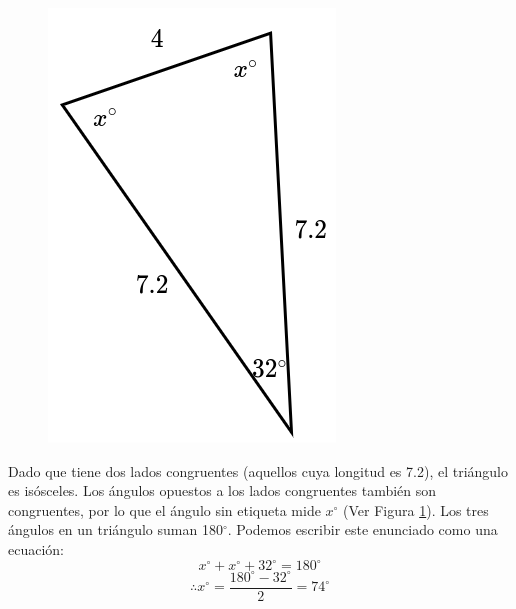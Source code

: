 \begin{minipage}[t][][t]{0.65\textwidth}
    \begin{solutionbox}{7cm}
        \begin{minipage}{0.3\textwidth}
            \begin{figure}[H]
                \centering
                \includegraphics[width=0.9\linewidth]{../images/findangle13a.png}
                \caption{}
                \label{fig:findangle13a}
            \end{figure}
        \end{minipage}\hfill
        \begin{minipage}{0.65\textwidth}
            Dado que tiene dos lados congruentes (aquellos cuya longitud es 7.2), el triángulo es isósceles. Los ángulos opuestos a los lados congruentes también son congruentes, por lo que el ángulo sin etiqueta mide $x^\circ$ (Ver Figura \ref{fig:findangle13a}).
            Los tres ángulos en un triángulo suman 180$^\circ$. Podemos escribir este enunciado como una ecuación:
            \[x^\circ + x^\circ + 32^\circ = 180^\circ \]
            \[\therefore x^\circ = \dfrac{180^\circ - 32^\circ}{2}  = 74^\circ\]
        \end{minipage}
    \end{solutionbox}
\end{minipage}